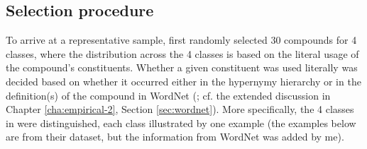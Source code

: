 \subsection{Selection procedure}
\label{sec:Reddy-selection}
To arrive at a representative sample, \citet{Reddyetal:2011} first randomly selected 30 compounds for 4 classes,
where the distribution across the 4 classes is based on the literal usage
of the compound's constituents. Whether a given constituent was used
literally was decided based on whether it occurred either
in the hypernymy hierarchy or in the definition(s) of the compound in
{WordNet} (\citealt{Fellbaum:1998}; cf. the extended discussion in Chapter \ref{cha:empirical-2}, Section \ref{sec:wordnet}). %
More specifically, the 4 classes in  were distinguished,
each class illustrated by one example (the examples below are from their dataset, but the information from WordNet was added by me).

